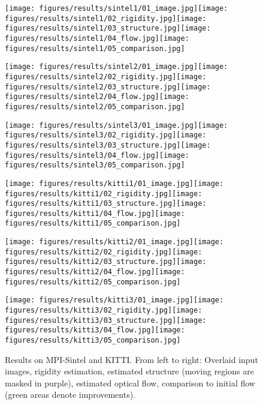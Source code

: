 \documentclass[10pt,twocolumn,letterpaper]{article}
\begin{document}
\begin{figure*}[ht]
\centerline{
		\texttt{[image: figures/results/sintel1/01\_image.jpg]}\texttt{[image: figures/results/sintel1/02\_rigidity.jpg]}\texttt{[image: figures/results/sintel1/03\_structure.jpg]}\texttt{[image: figures/results/sintel1/04\_flow.jpg]}\texttt{[image: figures/results/sintel1/05\_comparison.jpg]}}\centerline{
		\texttt{[image: figures/results/sintel2/01\_image.jpg]}\texttt{[image: figures/results/sintel2/02\_rigidity.jpg]}\texttt{[image: figures/results/sintel2/03\_structure.jpg]}\texttt{[image: figures/results/sintel2/04\_flow.jpg]}\texttt{[image: figures/results/sintel2/05\_comparison.jpg]}}\centerline{
		\texttt{[image: figures/results/sintel3/01\_image.jpg]}\texttt{[image: figures/results/sintel3/02\_rigidity.jpg]}\texttt{[image: figures/results/sintel3/03\_structure.jpg]}\texttt{[image: figures/results/sintel3/04\_flow.jpg]}\texttt{[image: figures/results/sintel3/05\_comparison.jpg]}}\centerline{
		\texttt{[image: figures/results/kitti1/01\_image.jpg]}\texttt{[image: figures/results/kitti1/02\_rigidity.jpg]}\texttt{[image: figures/results/kitti1/03\_structure.jpg]}\texttt{[image: figures/results/kitti1/04\_flow.jpg]}\texttt{[image: figures/results/kitti1/05\_comparison.jpg]}}\centerline{
		\texttt{[image: figures/results/kitti2/01\_image.jpg]}\texttt{[image: figures/results/kitti2/02\_rigidity.jpg]}\texttt{[image: figures/results/kitti2/03\_structure.jpg]}\texttt{[image: figures/results/kitti2/04\_flow.jpg]}\texttt{[image: figures/results/kitti2/05\_comparison.jpg]}}\centerline{
		\texttt{[image: figures/results/kitti3/01\_image.jpg]}\texttt{[image: figures/results/kitti3/02\_rigidity.jpg]}\texttt{[image: figures/results/kitti3/03\_structure.jpg]}\texttt{[image: figures/results/kitti3/04\_flow.jpg]}\texttt{[image: figures/results/kitti3/05\_comparison.jpg]}}		
	\caption{Results on MPI-Sintel and KITTI. From left to right: Overlaid input images, rigidity estimation, estimated structure (moving regions are masked in purple), estimated optical flow, comparison to initial flow (green areas denote improvements).} \label{fig:results}
\end{figure*}
\end{document}
